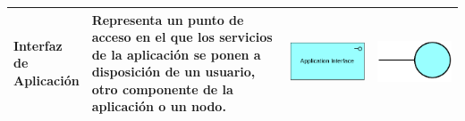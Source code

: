 \begin{longtable}{|p{0.15\linewidth}|p{0.45\linewidth}|p{0.2\linewidth} p{0.2\linewidth}|}
    Interfaz de Aplicación 
    &
    Representa un punto de acceso en el que los servicios de la aplicación se ponen a disposición de un usuario, otro componente de la aplicación o un nodo. 
    &
\begin{center}
    \includegraphics[width=1\linewidth]{imgs/capa_aplicacion/Aplication_interface.pdf}
\end{center} &
\begin{center}
    \includegraphics[width=0.7\linewidth]{imgs/capa_aplicacion/interfaz.pdf}
\end{center}
    \\ \hline




\end{longtable}
